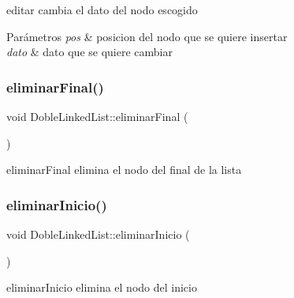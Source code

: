 editar cambia el dato del nodo escogido 


\begin{DoxyParams}{Parámetros}
{\em pos} & posicion del nodo que se quiere insertar \\
\hline
{\em dato} & dato que se quiere cambiar \\
\hline
\end{DoxyParams}
\mbox{\label{class_doble_linked_list_ab25d313f8f62c896e4d2e7f37be11e5b}} 
\subsubsection{\texorpdfstring{eliminar\+Final()}{eliminarFinal()}}
{\footnotesize\ttfamily void Doble\+Linked\+List\+::eliminar\+Final (\begin{DoxyParamCaption}{ }\end{DoxyParamCaption})\hspace{0.3cm}{\ttfamily [inline]}}



eliminar\+Final elimina el nodo del final de la lista 

\mbox{\label{class_doble_linked_list_af14d0ac70aae1708467c95320d383ab3}} 
\subsubsection{\texorpdfstring{eliminar\+Inicio()}{eliminarInicio()}}
{\footnotesize\ttfamily void Doble\+Linked\+List\+::eliminar\+Inicio (\begin{DoxyParamCaption}{ }\end{DoxyParamCaption})\hspace{0.3cm}{\ttfamily [inline]}}



eliminar\+Inicio elimina el nodo del inicio 

\mbox{\label{class_doble_linked_list_a331b1301572bb83ea836c64992723420}} 
